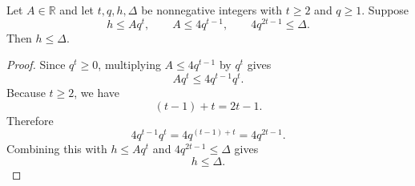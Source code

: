 \begin{helper}
Let \(A\in\mathbb R\) and let \(t,q,h,\Delta\) be nonnegative integers with
\(t\ge2\) and \(q\ge1\).  Suppose
\[
  h\le Aq^t,\qquad A\le4q^{t-1},\qquad 4q^{2t-1}\le\Delta.
\]
Then \(h\le\Delta\).
\end{helper}
\begin{proof}
Since \(q^t\ge0\), multiplying \(A\le4q^{t-1}\) by \(q^t\) gives
\[
  Aq^t\le4q^{t-1}q^t.
\]
Because \(t\ge2\), we have
\[
  (t-1)+t=2t-1.
\]
Therefore
\[
  4q^{t-1}q^t=4q^{(t-1)+t}=4q^{2t-1}.
\]
Combining this with \(h\le Aq^t\) and \(4q^{2t-1}\le\Delta\) gives
\[
  h\le\Delta.
\]
\end{proof}
